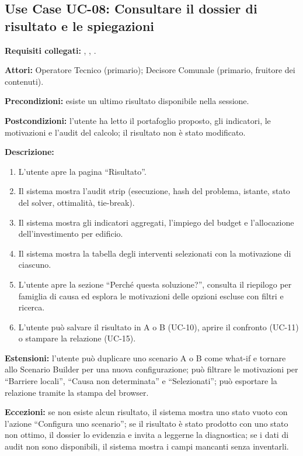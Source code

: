 \subsection*{Use Case UC-08: Consultare il dossier di risultato e le spiegazioni}
\textbf{Requisiti collegati:} , , .\par
\textbf{Attori:} Operatore Tecnico (primario); Decisore Comunale (primario, fruitore dei contenuti).\par
\textbf{Precondizioni:} esiste un ultimo risultato disponibile nella sessione.\par
\textbf{Postcondizioni:} l'utente ha letto il portafoglio proposto, gli indicatori, le motivazioni e l'audit del calcolo; il risultato non è stato modificato.\par
\textbf{Descrizione:}
\begin{enumerate}[leftmargin=1.6em, itemsep=0.1em]
    \item L'utente apre la pagina ``Risultato''.
    \item Il sistema mostra l'audit strip (esecuzione, hash del problema, istante, stato del solver, ottimalità, tie-break).
    \item Il sistema mostra gli indicatori aggregati, l'impiego del budget e l'allocazione dell'investimento per edificio.
    \item Il sistema mostra la tabella degli interventi selezionati con la motivazione di ciascuno.
    \item L'utente apre la sezione ``Perché questa soluzione?'', consulta il riepilogo per famiglia di causa ed esplora le motivazioni delle opzioni escluse con filtri e ricerca.
    \item L'utente può salvare il risultato in A o B (UC-10), aprire il confronto (UC-11) o stampare la relazione (UC-15).
\end{enumerate}
\textbf{Estensioni:} l'utente può duplicare uno scenario A o B come what-if e tornare allo Scenario Builder per una nuova configurazione; può filtrare le motivazioni per ``Barriere locali'', ``Causa non determinata'' e ``Selezionati''; può esportare la relazione tramite la stampa del browser.\par
\textbf{Eccezioni:} se non esiste alcun risultato, il sistema mostra uno stato vuoto con l'azione ``Configura uno scenario''; se il risultato è stato prodotto con uno stato non ottimo, il dossier lo evidenzia e invita a leggerne la diagnostica; se i dati di audit non sono disponibili, il sistema mostra i campi mancanti senza inventarli.

